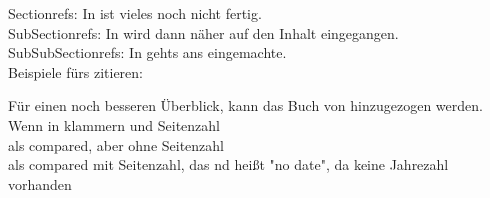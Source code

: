 Sectionrefs: In  ist vieles noch nicht fertig. \\
SubSectionrefs: In  wird dann näher auf den Inhalt eingegangen.\\
SubSubSectionrefs: In  gehts ans eingemachte.\\

Beispiele fürs zitieren:

Für einen noch besseren Überblick, kann das Buch von \citet{Butler2017} hinzugezogen werden.\\
Wenn in klammern und Seitenzahl \citep[p. 3]{Butler2017} \\

als compared, aber ohne Seitenzahl \citep[cmp.][]{Butler2017} \\
als compared mit Seitenzahl, das nd heißt "no date", da keine Jahrezahl vorhanden \citep[cmp.][p. 5]{Wang} \\

%
